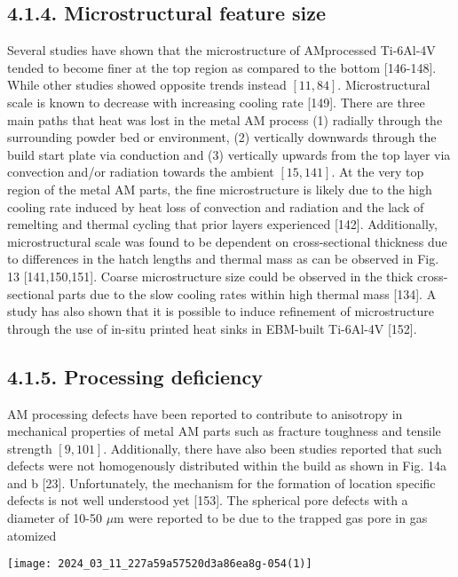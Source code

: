 \documentclass[10pt]{article}
\begin{document}
\subsection*{4.1.4. Microstructural feature size}
Several studies have shown that the microstructure of AMprocessed Ti-6Al-4V tended to become finer at the top region as compared to the bottom [146-148]. While other studies showed opposite trends instead $[11,84]$. Microstructural scale is known to decrease with increasing cooling rate [149]. There are three main paths that heat was lost in the metal AM process (1) radially through the surrounding powder bed or environment, (2) vertically downwards through the build start plate via conduction and (3) vertically upwards from the top layer via convection and/or radiation towards the ambient $[15,141]$. At the very top region of the metal AM parts, the fine microstructure is likely due to the high cooling rate induced by heat loss of convection and radiation and the lack of remelting and thermal cycling that prior layers experienced [142]. Additionally, microstructural scale was found to be dependent on cross-sectional thickness due to differences in the hatch lengths and thermal mass as can be observed in Fig. 13 [141,150,151]. Coarse microstructure size could be observed in the thick cross-sectional parts due to the slow cooling rates within high thermal mass [134]. A study has also shown that it is possible to induce refinement of microstructure through the use of in-situ printed heat sinks in EBM-built Ti-6Al-4V [152].

\subsection*{4.1.5. Processing deficiency}
AM processing defects have been reported to contribute to anisotropy in mechanical properties of metal AM parts such as fracture toughness and tensile strength $[9,101]$. Additionally, there have also been studies reported that such defects were not homogenously distributed within the build as shown in Fig. 14a and b [23]. Unfortunately, the mechanism for the formation of location specific defects is not well understood yet [153]. The spherical pore defects with a diameter of 10-50 $\mu \mathrm{m}$ were reported to be due to the trapped gas pore in gas atomized

\begin{center}
\texttt{[image: 2024\_03\_11\_227a59a57520d3a86ea8g-054(1)]}
\end{center}
\end{document}
